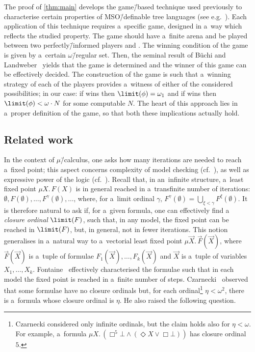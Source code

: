 \documentclass{lmcs}
\numberwithin{equation}{section}
\numberwithin{figure}{section}
\begin{document}
The proof of \cref{thm:main} develops the game\=/based technique used previously to characterise certain properties of MSO\=/definable tree languages (see e.g.~\cite{clemente_separability,walukiewicz_buchi}).
Each application of this technique requires a~specific game, designed in a~way which reflects the studied property.
The game should have a~finite arena and be played between two perfectly\=/informed players \eve and \adam.
The winning condition of the game is given by a~certain $\omega$\=/regular set.
Then, the seminal result of Büchi and Landweber~\cite{buchi_synthesis} yields that the game is determined and the winner of this game can be effectively decided.
The construction of the game is such that a~winning strategy of each of the players provides a~witness of either of the considered possibilities; in our case:
if \eve wins then $\limit(\phi)=\omega_1$ and if \adam wins then $\limit(\phi) < \omega\cdot N$ for some computable $N$.
The heart of this approach lies in a~proper definition of the game, so that both these implications actually hold.


\subsection*{Related work}

In the context of $\mu$\=/calculus, one asks how many iterations are needed to reach a~fixed point;
this aspect concerns complexity of model checking (cf.~\cite{julian-igor-handook,esparza-acceleration}), as well as expressive power of the logic (cf.~\cite{julian-igor-handook,bradfield_transfinite}).
Recall that, in an~infinite structure, a~least fixed point $\mu X.\, F(X)$ is in general reached in a~transfinite number of iterations:
$\emptyset, F(\emptyset),\ldots, F^{\gamma}(\emptyset), \ldots$, where, for a~limit ordinal $\gamma$, $F^{\gamma}(\emptyset) = \bigcup_{\xi < \gamma} F^{\xi}(\emptyset)$.
It is therefore natural to ask if, for a~given formula, one can effectively find a \emph{closure ordinal} $\limit(F)$,
such that, in any model, the fixed point can be reached in $\limit(F)$, but, in general, not in fewer iterations.
This notion generalises in a~natural way to a~vectorial least fixed point $\mu \vec{X}.\,\vec{F}(\vec{X})$,
where $\vec{F}(\vec{X})$ is a~tuple of formulae $F_1(\vec{X}),\dots,F_k(\vec{X})$ and $\vec{X}$ is a~tuple of variables $X_1,\dots,X_k$.
Fontaine~\cite{fontaine_continuous} effectively characterised the formulae such that in each model the fixed point is reached in a~finite number of steps.
Czarnecki~\cite{czarnecki_closure_fics} observed that some formulae have no closure ordinals but, for each ordinal\footnote{Czarnecki considered only infinite ordinals, but the claim holds also for $\eta < \omega$. For example, a~formula $\mu X.\, \left(\Box^5 \bot \wedge(\Diamond X \vee \Box \bot) \right)$ has closure ordinal $5$.} $\eta < \omega^2$, there is a~formula whose closure ordinal is $\eta$.
He also raised the following question.
\end{document}
